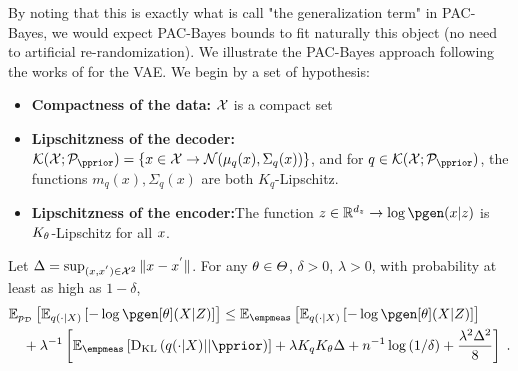 By noting that this is exactly what is call "the generalization term" in PAC-Bayes, we would expect PAC-Bayes bounds to fit naturally this object (no need to artificial re-randomization).
We illustrate the PAC-Bayes approach following the works of \cite{mbacke2023statistical} for the VAE. We begin by a set of hypothesis:
\begin{itemize}
    \item \textbf{Compactness of the data:} $\mathcal{X}$ is a compact set
    \item \textbf{Lipschitzness of the decoder:} $\mathcal{K}(\xsp; \pset{\pprior}) = \{\lstate \in \xsp \rightarrow \gauss(\mu_q(x), \Sigma_q(x)) \}$, and for $q \in \mathcal{K}(\xsp; \pset{\pprior})$, the functions $m_q(x), \Sigma_q(x)$ are both $K_{q}$-Lipschitz.
    \item \textbf{Lipschitzness of the encoder:}The function $z \in \rset^{\latdim} \rightarrow \log \pgen(\lstate|z)$ is $K_{\theta}$-Lipschitz for all $x$.
\end{itemize}
\begin{theorem}
    \label{thm:gen:vae:rec_bound}
    Let $\Delta = \sup_{(x, {x}^{'}) \in \mathcal{X}^2} \|x - {x}^{'}\|$. For any $\theta \in \varTheta$, $\delta > 0$, $\lambda > 0$, with probability at least as high as $1 - \delta$,
    \begin{align}
        &\PE{\pdata}{\PE{q(\cdot | \state)}{ - \log \pgen[\param](\state | Z)}} \leq \PE{\empmeas}{\PE{q(\cdot | \state)}{ - \log \pgen[\param](\state | Z)}} \\
        &\quad + \lambda^{-1}\left[\PE{\empmeas}{\kl{q(\cdot|\state)}{\pprior}} + \lambda K_{q} K_{\param}\Delta + n^{-1}\log \left({1}/{\delta}\right) + \frac{\lambda^2 \Delta^2}{8} \right] \eqsp.
    \end{align}
\end{theorem}

